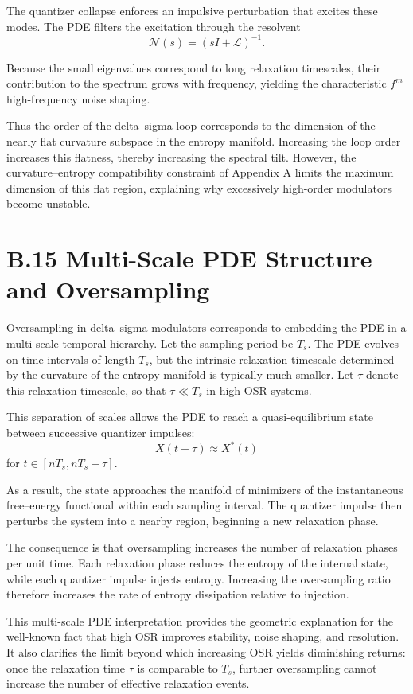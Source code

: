 The quantizer collapse enforces an impulsive perturbation that excites these modes. The PDE filters the excitation through the resolvent
\[
\mathcal{N}(s) = (sI + \mathcal{L})^{-1}.
\]

Because the small eigenvalues correspond to long relaxation timescales, their contribution to the spectrum grows with frequency, yielding the characteristic \(f^{m}\) high-frequency noise shaping.

Thus the order of the delta–sigma loop corresponds to the dimension of the nearly flat curvature subspace in the entropy manifold. Increasing the loop order increases this flatness, thereby increasing the spectral tilt. However, the curvature–entropy compatibility constraint of Appendix A limits the maximum dimension of this flat region, explaining why excessively high-order modulators become unstable.

\section{B.15 Multi-Scale PDE Structure and Oversampling}

Oversampling in delta–sigma modulators corresponds to embedding the PDE in a multi-scale temporal hierarchy. Let the sampling period be \(T_{s}\). The PDE evolves on time intervals of length \(T_{s}\), but the intrinsic relaxation timescale determined by the curvature of the entropy manifold is typically much smaller. Let \(\tau\) denote this relaxation timescale, so that \(\tau \ll T_{s}\) in high-OSR systems.

This separation of scales allows the PDE to reach a quasi-equilibrium state between successive quantizer impulses:
\[
X(t + \tau) \approx X^{\ast}(t)
\]
for \(t \in [nT_{s}, nT_{s} + \tau]\).

As a result, the state approaches the manifold of minimizers of the instantaneous free–energy functional within each sampling interval. The quantizer impulse then perturbs the system into a nearby region, beginning a new relaxation phase.

The consequence is that oversampling increases the number of relaxation phases per unit time. Each relaxation phase reduces the entropy of the internal state, while each quantizer impulse injects entropy. Increasing the oversampling ratio therefore increases the rate of entropy dissipation relative to injection.

This multi-scale PDE interpretation provides the geometric explanation for the well-known fact that high OSR improves stability, noise shaping, and resolution. It also clarifies the limit beyond which increasing OSR yields diminishing returns: once the relaxation time \(\tau\) is comparable to \(T_{s}\), further oversampling cannot increase the number of effective relaxation events.

